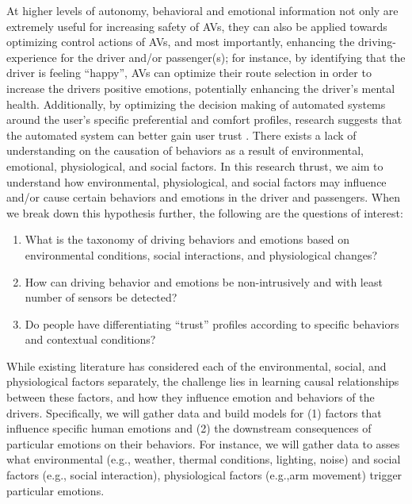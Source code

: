 At higher levels of autonomy, behavioral and emotional information not only are extremely useful for increasing safety of AVs, they can also be applied towards optimizing control actions of AVs, and most importantly, enhancing the  driving-experience for the driver and/or passenger(s); for instance, by identifying that the driver is feeling ``happy'', AVs can optimize their route selection in order to increase the drivers positive emotions, potentially enhancing the driver's mental health. 
Additionally, by optimizing the decision making of automated systems around the user's specific preferential and comfort profiles, research suggests that the automated system can better gain user trust \cite{mouloua2018automation, noah2017first}. 
There exists a lack of understanding on the causation of behaviors as a result of environmental, emotional, physiological, and social factors. %
In this research thrust, we aim to understand how environmental, physiological, and social factors may influence and/or cause certain behaviors and emotions in the driver and passengers. 
When we break down this hypothesis further, the following are the questions of interest:
\begin{enumerate}[itemsep=0pt,parsep=0pt,topsep=4pt,leftmargin=0.4in]
    \item What is the taxonomy of driving behaviors and emotions based on environmental conditions, social interactions, and physiological changes?
    \item How can driving behavior and emotions be non-intrusively and with least number of sensors be detected?
    \item Do people have differentiating “trust” profiles according to specific behaviors and contextual conditions?  
\end{enumerate}
While existing literature has considered each of the environmental, social, and physiological factors separately, the challenge lies in learning causal relationships between these factors, and how they influence emotion and behaviors of the drivers.  
Specifically, we will gather data and build models for (1) factors that influence specific human emotions and (2) the downstream consequences of particular emotions on their behaviors. 
For instance, we will gather data to asses what environmental (e.g., weather, thermal conditions, lighting, noise) and social factors (e.g., social interaction), physiological factors (e.g.,arm movement) trigger particular emotions.

